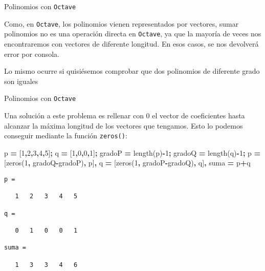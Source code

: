 \documentclass[
  ignorenonframetext,
]{beamer}
\newenvironment{Shaded}{\begin{snugshade}}{\end{snugshade}}
\newcommand{\FloatTok}[1]{\textcolor[rgb]{0.00,0.00,0.81}{#1}}
\newcommand{\FunctionTok}[1]{\textcolor[rgb]{0.00,0.00,0.00}{#1}}
\newcommand{\NormalTok}[1]{#1}
\newcommand{\OperatorTok}[1]{\textcolor[rgb]{0.81,0.36,0.00}{\textbf{#1}}}
\begin{document}
\begin{frame}[fragile]{Polinomios con \texttt{Octave}}
\protect\hypertarget{polinomios-con-octave-3}{}

Como, en \texttt{Octave}, los polinomios vienen representados por
vectores, sumar polinomios no es una operación directa en
\texttt{Octave}, ya que la mayoría de veces nos encontraremos con
vectores de diferente longitud. En esos casos, se nos devolverá error
por consola.

Lo mismo ocurre si quisiésemos comprobar que dos polinomios de diferente
grado son iguales

\end{frame}

\begin{frame}[fragile]{Polinomios con \texttt{Octave}}
\protect\hypertarget{polinomios-con-octave-4}{}

Una solución a este problema es rellenar con 0 el vector de coeficientes
hasta alcanzar la máxima longitud de los vectores que tengamos. Esto lo
podemos conseguir mediante la función \texttt{zeros()}:

\begin{Shaded}
\begin{Highlighting}[]
\NormalTok{p }\OperatorTok{=}\NormalTok{ [}\FloatTok{1}\OperatorTok{,}\FloatTok{2}\OperatorTok{,}\FloatTok{3}\OperatorTok{,}\FloatTok{4}\OperatorTok{,}\FloatTok{5}\NormalTok{]}\OperatorTok{;}\NormalTok{ q }\OperatorTok{=}\NormalTok{ [}\FloatTok{1}\OperatorTok{,}\FloatTok{0}\OperatorTok{,}\FloatTok{0}\OperatorTok{,}\FloatTok{1}\NormalTok{]}\OperatorTok{;}\NormalTok{ gradoP }\OperatorTok{=} \FunctionTok{length}\NormalTok{(p)}\OperatorTok{-}\FloatTok{1}\OperatorTok{;}\NormalTok{ gradoQ }\OperatorTok{=} \FunctionTok{length}\NormalTok{(q)}\OperatorTok{-}\FloatTok{1}\OperatorTok{;}
\NormalTok{p }\OperatorTok{=}\NormalTok{ [}\FunctionTok{zeros}\NormalTok{(}\FloatTok{1}\OperatorTok{,}\NormalTok{ gradoQ}\OperatorTok{-}\NormalTok{gradoP)}\OperatorTok{,}\NormalTok{ p]}\OperatorTok{,}\NormalTok{ q }\OperatorTok{=}\NormalTok{ [}\FunctionTok{zeros}\NormalTok{(}\FloatTok{1}\OperatorTok{,}\NormalTok{ gradoP}\OperatorTok{-}\NormalTok{gradoQ)}\OperatorTok{,}\NormalTok{ q]}\OperatorTok{,}\NormalTok{ suma }\OperatorTok{=}\NormalTok{ p}\OperatorTok{+}\NormalTok{q}
\end{Highlighting}
\end{Shaded}

\begin{verbatim}
p =

   1   2   3   4   5

q =

   0   1   0   0   1

suma =

   1   3   3   4   6
\end{verbatim}

\end{frame}
\end{document}
